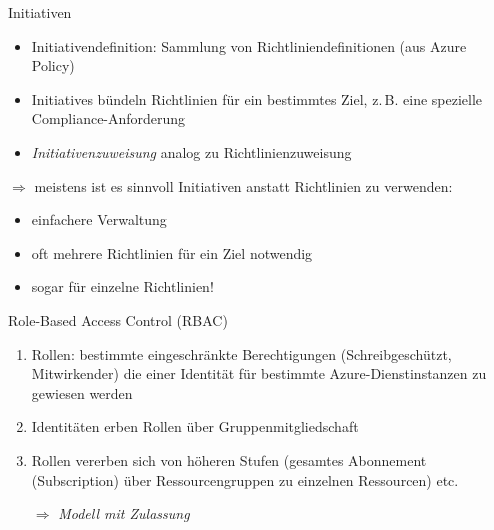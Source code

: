 \begin{flashcard}[Definition]{Initiativen}
    \begin{itemize}
        \item Initiativendefinition:\newline
        Sammlung von Richtliniendefinitionen (aus Azure Policy)
        \item Initiatives bündeln Richtlinien für ein bestimmtes Ziel, z.\,B. eine spezielle Compliance-Anforderung
        \item \emph{Initiativenzuweisung} analog zu Richtlinienzuweisung
    \end{itemize}
    
    \vspace{5mm}
    $\Rightarrow$ meistens ist es sinnvoll Initiativen anstatt Richtlinien zu verwenden:
    \begin{itemize}
        \item einfachere Verwaltung
        \item oft mehrere Richtlinien für ein Ziel notwendig
        \item sogar für einzelne Richtlinien!
    \end{itemize}

\end{flashcard}

\begin{flashcard}[Definition]{Role-Based Access Control (RBAC)}
    \begin{enumerate}
        \item Rollen: bestimmte eingeschränkte Berechtigungen (Schreibgeschützt, Mitwirkender) die einer Identität für bestimmte Azure-Dienstinstanzen zu gewiesen werden
        \item Identitäten erben Rollen über Gruppenmitgliedschaft
        \item Rollen vererben sich von höheren Stufen (gesamtes Abonnement (Subscription) über Ressourcengruppen zu einzelnen Ressourcen) etc.
        \item[$\Rightarrow$] \emph{Modell mit Zulassung}
    \end{enumerate}
\end{flashcard}

